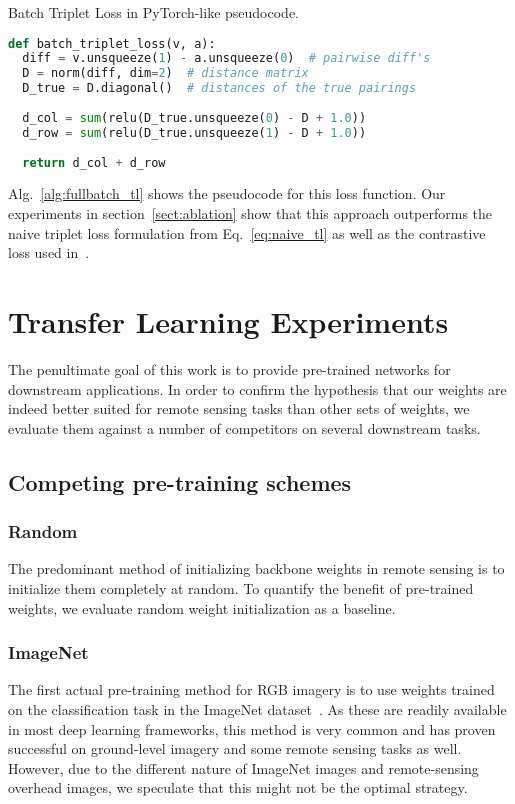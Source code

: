 \documentclass[journal]{IEEEtran}
\begin{document}
\begin{algorithm}[t]
\caption{Batch Triplet Loss in PyTorch-like pseudocode.}
\label{alg:fullbatch_tl}
\begin{lstlisting}[language=python]
def batch_triplet_loss(v, a):
  diff = v.unsqueeze(1) - a.unsqueeze(0)  # pairwise diff's
  D = norm(diff, dim=2)  # distance matrix
  D_true = D.diagonal()  # distances of the true pairings
  
  d_col = sum(relu(D_true.unsqueeze(0) - D + 1.0))
  d_row = sum(relu(D_true.unsqueeze(1) - D + 1.0))
  
  return d_col + d_row
\end{lstlisting}
\end{algorithm}
%
 Alg.~\ref{alg:fullbatch_tl} shows the pseudocode for this loss function.
Our experiments in section~\ref{sect:ablation} show that this approach outperforms the naive triplet
loss formulation from Eq.~\ref{eq:naive_tl} as well as
the contrastive loss used in~\cite{simclr}.

\section{Transfer Learning Experiments}\label{sect:experiments}
The penultimate goal of this work is to provide pre-trained networks for downstream applications.
In order to confirm the hypothesis that our weights are indeed better suited for remote sensing
tasks than other sets of weights, we evaluate them against a number of competitors on
several downstream tasks.

\subsection{Competing pre-training schemes}
\subsubsection{Random}
The predominant method of initializing backbone weights in remote sensing
is to initialize them completely at random.
To quantify the benefit of pre-trained weights,
we evaluate random weight initialization as a baseline.
\subsubsection{ImageNet}
The first actual pre-training method for RGB imagery is to use weights
trained on the classification task in the ImageNet dataset~\cite{imagenet}.
As these are readily available in most deep learning frameworks,
this method is very common and has proven successful on ground-level imagery and some remote sensing
tasks as well.
However, due to the different nature of ImageNet images and remote-sensing overhead images,
we speculate that this might not be the optimal strategy.
\end{document}

